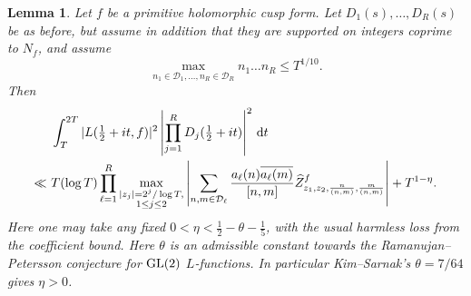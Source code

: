 \documentclass[oneside, 12pt]{amsart}
\newtheorem{lem}[thm]{Lemma}
\theoremstyle{definition}
\begin{document}
	\begin{lem}\label{cuspSecondMomentProductSplitting}
		Let $f$ be a primitive holomorphic cusp form. Let $D_1(s),\dots,D_R(s)$ be as before, but assume in addition that they are supported on integers coprime to $N_f$, and assume $$\max_{n_1 \in \mathcal{D}_1, \dots, n_R \in \mathcal{D}_R} n_1\dots n_R \leq T^{1/10}.$$ Then 
		\begin{align*}
			&\int_T^{2T} |L(\tfrac12+it,f)|^2\left|\prod_{j=1}^R D_j(\tfrac12+it)\right|^2 \, \textup{d}t \\
			\ll\,\, &{T(\log T)\prod_{\ell=1}^R \max_{\substack{|z_j|=2^j/\log T, \\ 1\leq j \leq 2}} \left|\sum_{n,m\in \mathcal{D}_\ell} \frac{a_\ell(n)\overline{a_\ell(m)}}{[n,m]}\widehat Z^f_{z_1,z_2,\frac{n}{(n,m)},\frac{m}{(n,m)}}\right|+T^{1-\eta}}.
		\end{align*}
		{Here one may take any fixed
			$0<\eta<\frac12-\theta-\frac15$, with the usual harmless loss from
			the coefficient bound. Here $\theta$ is an admissible constant towards the Ramanujan--Petersson conjecture for $\textup{GL}(2)$ $L$-functions. In particular Kim--Sarnak's $\theta=7/64$ \cite{KimSarnak} gives $\eta>0$.}
	\end{lem}
	
\end{document}
